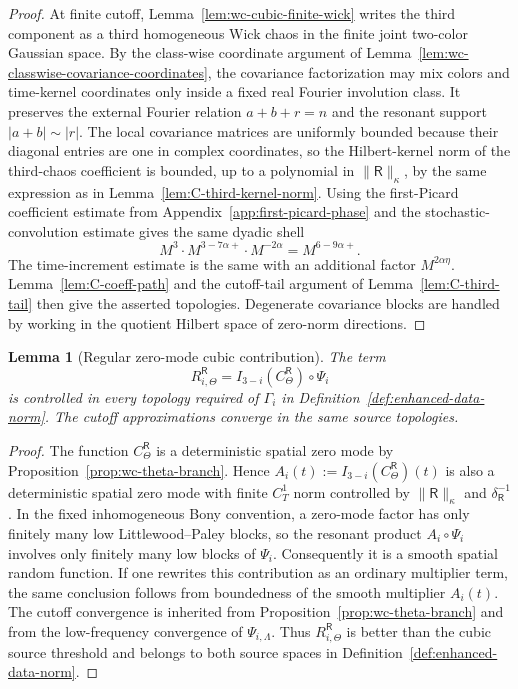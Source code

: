 \documentclass[10pt]{amsart}
\numberwithin{equation}{section}
\theoremstyle{plain}
\newtheorem{lemma}[theorem]{Lemma}
\theoremstyle{definition}
\theoremstyle{remark}
\begin{document}
\begin{proof}
At finite cutoff, Lemma~\ref{lem:wc-cubic-finite-wick} writes the third component as a third homogeneous Wick chaos in the finite joint two-color Gaussian space.  By the class-wise coordinate argument of Lemma~\ref{lem:wc-classwise-covariance-coordinates}, the covariance factorization may mix colors and time-kernel coordinates only inside a fixed real Fourier involution class.  It preserves the external Fourier relation \(a+b+r=n\) and the resonant support \(|a+b|\sim |r|\).  The local covariance matrices are uniformly bounded because their diagonal entries are one in complex coordinates, so the Hilbert-kernel norm of the third-chaos coefficient is bounded, up to a polynomial in \(\|\mathsf R\|_\kappa\), by the same expression as in Lemma~\ref{lem:C-third-kernel-norm}.  Using the first-Picard coefficient estimate from Appendix~\ref{app:first-picard-phase} and the stochastic-convolution estimate gives the same dyadic shell
\[
        M^3\cdot M^{3-7\alpha+}\cdot M^{-2\alpha}=M^{6-9\alpha+}.
\]
The time-increment estimate is the same with an additional factor \(M^{2\alpha\eta}\).  Lemma~\ref{lem:C-coeff-path} and the cutoff-tail argument of Lemma~\ref{lem:C-third-tail} then give the asserted topologies.  Degenerate covariance blocks are handled by working in the quotient Hilbert space of zero-norm directions.
\end{proof}

\begin{lemma}[Regular zero-mode cubic contribution]\label{lem:wc-regular-zero-mode-cubic}
The term
\[
        R_{i,\Theta}^{\mathsf R}=I_{3-i}(C_\Theta^{\mathsf R})\circ\Psi_i
\]
is controlled in every topology required of \(\Gamma_i\) in Definition~\ref{def:enhanced-data-norm}.  The cutoff approximations converge in the same source topologies.
\end{lemma}

\begin{proof}
The function \(C_\Theta^{\mathsf R}\) is a deterministic spatial zero mode by Proposition~\ref{prop:wc-theta-branch}.  Hence \(A_i(t):=I_{3-i}(C_\Theta^{\mathsf R})(t)\) is also a deterministic spatial zero mode with finite \(C^1_T\) norm controlled by \(\|\mathsf R\|_\kappa\) and \(\delta_{\mathsf R}^{-1}\).  In the fixed inhomogeneous Bony convention, a zero-mode factor has only finitely many low Littlewood--Paley blocks, so the resonant product \(A_i\circ\Psi_i\) involves only finitely many low blocks of \(\Psi_i\).  Consequently it is a smooth spatial random function.  If one rewrites this contribution as an ordinary multiplier term, the same conclusion follows from boundedness of the smooth multiplier \(A_i(t)\).  The cutoff convergence is inherited from Proposition~\ref{prop:wc-theta-branch} and from the low-frequency convergence of \(\Psi_{i,\Lambda}\).  Thus \(R_{i,\Theta}^{\mathsf R}\) is better than the cubic source threshold and belongs to both source spaces in Definition~\ref{def:enhanced-data-norm}.
\end{proof}
\end{document}
